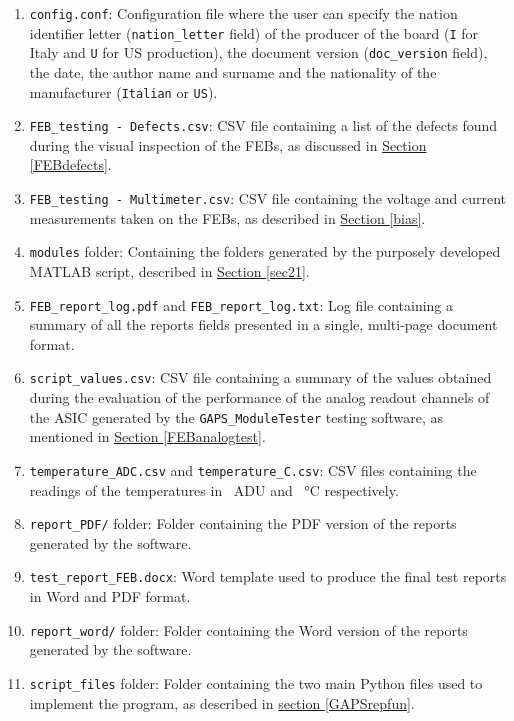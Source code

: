 \begin{enumerate}
    \itemsep0em
    \item \texttt{config.conf}: Configuration file where the user can specify the nation identifier letter (\texttt{nation\_letter} field) of the producer of the board (\texttt{I} for Italy and \texttt{U} for US production), the document version (\texttt{doc\_version} field), the date, the author name and surname and the nationality of the manufacturer (\texttt{Italian} or \texttt{US}). 
    \item \texttt{FEB\_testing - Defects.csv}: CSV file containing a list of the defects found during the visual inspection of the FEBs, as discussed in \hyperref[FEBdefects]{Section \ref{FEBdefects}}.
    \item \texttt{FEB\_testing - Multimeter.csv}: CSV file containing the voltage and current measurements taken on the FEBs, as described in \hyperref[bias]{Section \ref{bias}}.
    \item \texttt{modules} folder: Containing the folders generated by the purposely developed MATLAB script, described in \hyperref[sec21]{Section \ref{sec21}}.
    \item \texttt{FEB\_report\_log.pdf} and \texttt{FEB\_report\_log.txt}: Log file containing a summary of all the reports fields presented in a single, multi-page document format.
    \item \texttt{script\_values.csv}: CSV file containing a summary of the values obtained during the evaluation of the performance of the analog readout channels of the ASIC generated by the \texttt{GAPS\_ModuleTester} testing software, as mentioned in \hyperref[FEBanalogtest]{Section \ref{FEBanalogtest}}.
    \item \texttt{temperature\_ADC.csv} and \texttt{temperature\_C.csv}: CSV files containing the readings of the temperatures in \SI{}{ADU} and \SI{}{\celsius} respectively.
    \item \texttt{report\_PDF/} folder: Folder containing the PDF version of the reports generated by the software.
    \item \texttt{test\_report\_FEB.docx}: Word template used to produce the final test reports in Word and PDF format.
    \item \texttt{report\_word/} folder: Folder containing the Word version of the reports generated by the software.
    \item \texttt{script\_files} folder: Folder containing the two main Python files used to implement the program, as described in \hyperref[GAPSrepfun]{section \ref{GAPSrepfun}}.
\end{enumerate}

